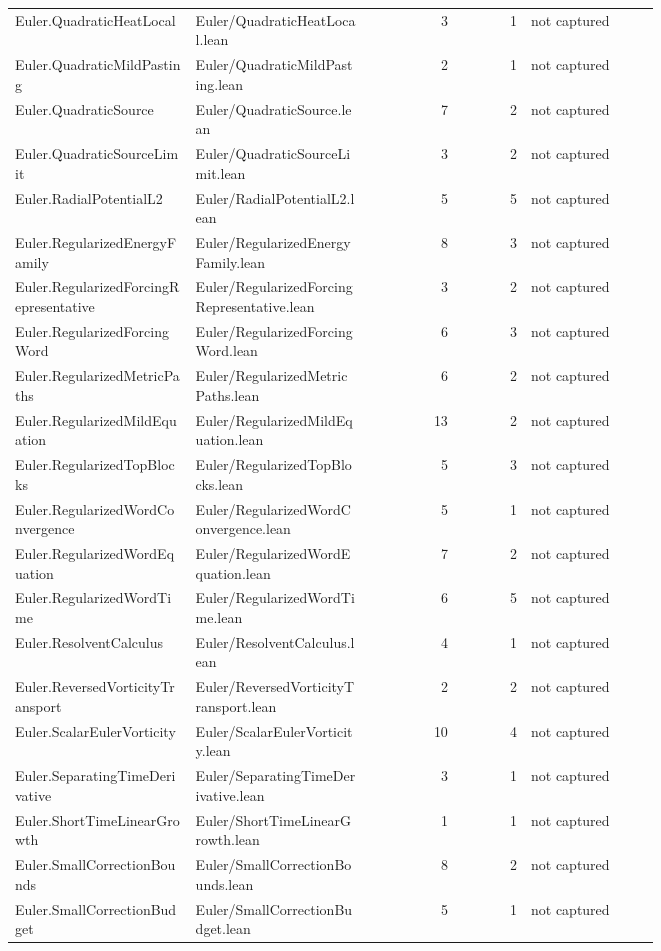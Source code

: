 \documentclass[10pt]{article}
\begin{document}
\begin{longtable}{p{0.28\linewidth}p{0.27\linewidth}r r p{0.20\linewidth}}
Euler.QuadraticHeatLocal & Euler/QuadraticHeatLocal.lean & 3 & 1 & not captured\\
Euler.QuadraticMildPasting & Euler/QuadraticMildPasting.lean & 2 & 1 & not captured\\
Euler.QuadraticSource & Euler/QuadraticSource.lean & 7 & 2 & not captured\\
Euler.QuadraticSourceLimit & Euler/QuadraticSourceLimit.lean & 3 & 2 & not captured\\
Euler.RadialPotentialL2 & Euler/RadialPotentialL2.lean & 5 & 5 & not captured\\
Euler.RegularizedEnergyFamily & Euler/RegularizedEnergyFamily.lean & 8 & 3 & not captured\\
Euler.RegularizedForcingRepresentative & Euler/RegularizedForcingRepresentative.lean & 3 & 2 & not captured\\
Euler.RegularizedForcingWord & Euler/RegularizedForcingWord.lean & 6 & 3 & not captured\\
Euler.RegularizedMetricPaths & Euler/RegularizedMetricPaths.lean & 6 & 2 & not captured\\
Euler.RegularizedMildEquation & Euler/RegularizedMildEquation.lean & 13 & 2 & not captured\\
Euler.RegularizedTopBlocks & Euler/RegularizedTopBlocks.lean & 5 & 3 & not captured\\
Euler.RegularizedWordConvergence & Euler/RegularizedWordConvergence.lean & 5 & 1 & not captured\\
Euler.RegularizedWordEquation & Euler/RegularizedWordEquation.lean & 7 & 2 & not captured\\
Euler.RegularizedWordTime & Euler/RegularizedWordTime.lean & 6 & 5 & not captured\\
Euler.ResolventCalculus & Euler/ResolventCalculus.lean & 4 & 1 & not captured\\
Euler.ReversedVorticityTransport & Euler/ReversedVorticityTransport.lean & 2 & 2 & not captured\\
Euler.ScalarEulerVorticity & Euler/ScalarEulerVorticity.lean & 10 & 4 & not captured\\
Euler.SeparatingTimeDerivative & Euler/SeparatingTimeDerivative.lean & 3 & 1 & not captured\\
Euler.ShortTimeLinearGrowth & Euler/ShortTimeLinearGrowth.lean & 1 & 1 & not captured\\
Euler.SmallCorrectionBounds & Euler/SmallCorrectionBounds.lean & 8 & 2 & not captured\\
Euler.SmallCorrectionBudget & Euler/SmallCorrectionBudget.lean & 5 & 1 & not captured\\

\end{longtable}
\end{document}
